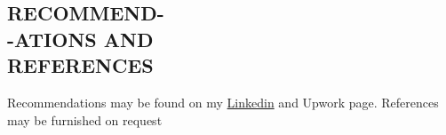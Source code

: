 \documentclass[margin, 10pt]{res} %
\begin{document}
\begin{resume}
\section{RECOMMEND- \\-ATIONS AND \\ REFERENCES } 
Recommendations may be found on my \href{https://www.linkedin.com/in/ikramu/}{Linkedin} and Upwork page. References may be furnished on request
\begin{comment}
\begin{itemize}
\item Dr. Jens Lagergren \\
Professor in computer science and computational biology \\
KTH \& Scilifelab Stockholm \\
\href{http://www.nada.kth.se/~jensl/}{http://www.nada.kth.se/$\sim$jensl/} 

\item Dr. Lars Arvestad \\
Senior lecturer in computational biology \\
Stockholm University \& Scilifelab Stockholm \\
\hfill \href{http://www.nada.kth.se/~arve/}{http://www.nada.kth.se/$\sim$arve/}
\end{itemize}
\end{comment}

\end{resume}
\end{document}
